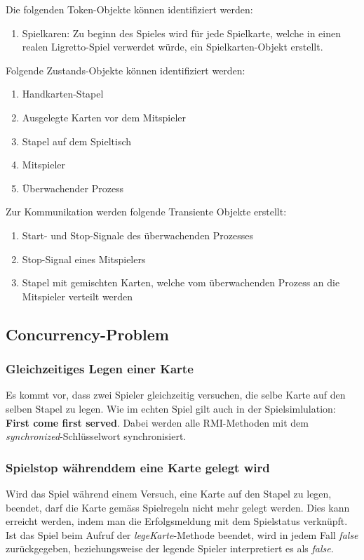 Die folgenden Token-Objekte können identifiziert werden:
\begin{enumerate}
	\item Spielkaren: Zu beginn des Spieles wird für jede Spielkarte, welche in einen realen Ligretto-Spiel verwerdet würde, ein Spielkarten-Objekt erstellt.
\end{enumerate}

Folgende Zustands-Objekte können identifiziert werden:
\begin{enumerate}
	\item Handkarten-Stapel
	\item Ausgelegte Karten vor dem Mitspieler
	\item Stapel auf dem Spieltisch
	\item Mitspieler
	\item Überwachender Prozess
\end{enumerate}

Zur Kommunikation werden folgende Transiente Objekte erstellt:
\begin{enumerate}
	\item Start- und Stop-Signale des überwachenden Prozesses
	\item Stop-Signal eines Mitspielers
	\item Stapel mit gemischten Karten, welche vom überwachenden Prozess an die Mitspieler verteilt werden
\end{enumerate}


\subsection{Concurrency-Problem}

\subsubsection{Gleichzeitiges Legen einer Karte}
Es kommt vor, dass zwei Spieler gleichzeitig versuchen, die selbe Karte auf den selben Stapel zu legen. Wie im echten Spiel gilt auch in der Spielsimlulation: \textbf{First come first served}. Dabei werden alle RMI-Methoden mit dem \textit{synchronized}-Schlüsselwort synchronisiert.

\subsubsection{Spielstop währenddem eine Karte gelegt wird}
Wird das Spiel während einem Versuch, eine Karte auf den Stapel zu legen, beendet, darf die Karte gemäss Spielregeln nicht mehr gelegt werden. Dies kann erreicht werden, indem man die Erfolgsmeldung mit dem Spielstatus verknüpft. Ist das Spiel beim Aufruf der \textit{legeKarte}-Methode beendet, wird in jedem Fall \textit{false} zurückgegeben, beziehungsweise der legende Spieler interpretiert es als \textit{false}.

